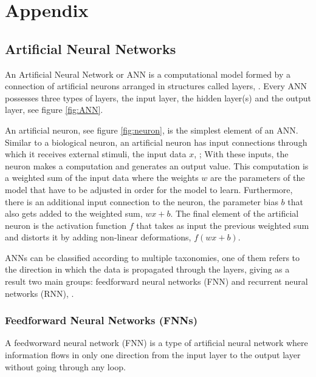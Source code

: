\chapter{Appendix}
\label{appendix:Appendix}
\appendix




\section{Artificial Neural Networks}

An Artificial Neural Network or ANN is a computational model formed by a connection of artificial neurons arranged in structures called layers, \cite{ANN-graupe:2013}. Every ANN possesses three types of layers, the input layer, the hidden layer(s) and the output layer, see figure \ref{fig:ANN}.


An artificial neuron, see figure \ref{fig:neuron}, is the simplest element of an ANN. Similar to a biological neuron, an artificial neuron has input connections through which it receives external stimuli, the input data $x$, \cite{ANN-graupe:2013}; With these inputs, the neuron makes a computation and generates an output value. This computation is a weighted sum of the input data where the weights $w$ are the parameters of the model that have to be adjusted in order for the model to learn. Furthermore, there is an additional input connection to the neuron, the parameter bias $b$ that also gets added to the weighted sum, $wx + b$. The final element of the artificial neuron is the activation function $f$ that takes as input the previous weighted sum and distorts it by adding non-linear deformations, $f(wx + b)$.



ANNs can be classified according to multiple taxonomies, one of them refers to the direction in which the data is propagated through the layers, giving as a result two main groups: feedforward neural networks (FNN) and recurrent neural networks (RNN), \cite{Classification-Artificial-Neural-Networks:2017}.

\subsection{Feedforward Neural Networks (FNNs)}

A feedworward neural network (FNN) is a type of artificial neural network where information flows in only one direction from the input layer to the output layer without going through any loop.
  \vspace{1mm} \\


